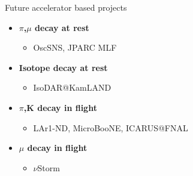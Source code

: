 \begin{frame}[t]{Future accelerator based projects}

\begin{itemize}
   \item {\bf $\pi$,$\mu$   decay at rest}
     \begin{itemize}
        \item OscSNS, JPARC MLF
     \end{itemize}
   \item {\bf Isotope decay at rest}
     \begin{itemize}
         \item IsoDAR@KamLAND
     \end{itemize}
   \item {\bf $\pi$,K decay in flight}
     \begin{itemize}
          \item LAr1-ND, MicroBooNE, ICARUS@FNAL
     \end{itemize}
   \item {\bf $\mu$ decay in flight}
     \begin{itemize}
           \item $\nu$Storm
     \end{itemize}
\end{itemize}


\end{frame}



